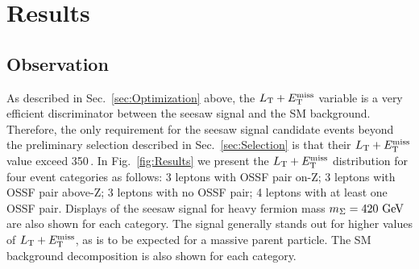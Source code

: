 \chapter{Results}
\label{chap:Results}

\section{Observation}

As described in Sec.~\ref{sec:Optimization} above, the $L_\textrm{T} + E_{\mathrm{T}}^{\text{miss}}$ variable is a very efficient discriminator between the seesaw signal and the SM background. Therefore, the only requirement for the seesaw signal candidate events beyond the preliminary selection described in Sec.~\ref{sec:Selection} is that their $L_\textrm{T} + E_{\mathrm{T}}^{\text{miss}}$ value exceed 350\,\GeV. In Fig.~\ref{fig:Results} we present the $L_\textrm{T} + E_{\mathrm{T}}^{\text{miss}}$ distribution for four event categories as follows: 3 leptons with OSSF pair on-Z; 3 leptons with OSSF pair above-Z; 3 leptons with no OSSF pair; 4 leptons with at least one OSSF pair. Displays of the seesaw signal for heavy fermion mass $m_\Sigma = 420\,\,\text{Ge\hspace{-.08em}V}$ are also shown for each category. The signal generally stands out for higher values of $L_\textrm{T} + E_{\mathrm{T}}^{\text{miss}}$, as is to be expected for a massive parent particle. The SM background decomposition is also shown for each category.

